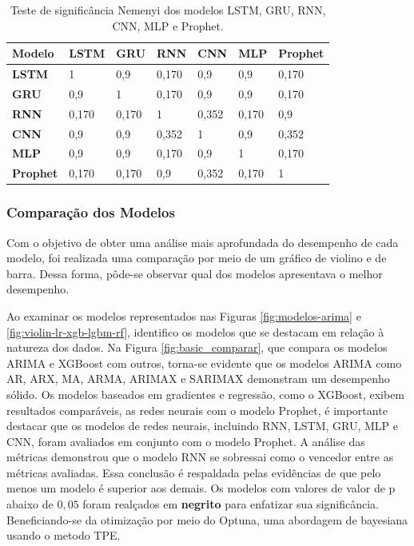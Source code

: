 \begin{table}[!htb]
	\caption{Teste de significância Nemenyi dos modelos LSTM, GRU, RNN, CNN, MLP e Prophet.}\label{tb:nemeyirede}
	\centering
\begin{tabular}{@{}lllllll@{}}
	\toprule
	\textbf{Modelo} & \textbf{LSTM} & \textbf{GRU} & \textbf{RNN} & \textbf{CNN} & \textbf{MLP} & \textbf{Prophet} \\ \midrule
	\textbf{LSTM}    & 1             & 0,9          & 0,170        & 0,9          & 0,9          & 0,170            \\
	\textbf{GRU}     & 0,9           & 1            & 0,170        & 0,9          & 0,9          & 0,170            \\
	\textbf{RNN}     & 0,170         & 0,170        & 1            & 0,352        & 0,170        & 0,9              \\
	\textbf{CNN}     & 0,9           & 0,9          & 0,352        & 1            & 0,9          & 0,352            \\
	\textbf{MLP}     & 0,9           & 0,9          & 0,170        & 0,9          & 1            & 0,170            \\
	\textbf{Prophet} & 0,170         & 0,170        & 0,9          & 0,352        & 0,170        & 1                \\ \bottomrule
\end{tabular}
\end{table}





\subsubsection{Compara\c c\~ao dos Modelos}

Com o objetivo de obter uma análise mais aprofundada do desempenho de cada modelo, foi realizada uma comparação por meio de um gráfico de violino e de barra. Dessa forma, pôde-se observar qual dos modelos apresentava o melhor desempenho.

Ao examinar os modelos representados nas Figuras \ref{fig:modelos-arima} e \ref{fig:violin-lr-xgb-lgbm-rf}, identifico os modelos que se destacam em relação à natureza dos dados. Na Figura \ref{fig:basic_comparar}, que compara os modelos ARIMA e XGBoost com outros, torna-se evidente que os modelos ARIMA como AR, ARX, MA, ARMA, ARIMAX e SARIMAX demonstram um desempenho sólido. Os modelos baseados em gradientes e regressão, como o XGBoost, exibem resultados comparáveis, as redes neurais com o modelo Prophet, é importante destacar que os modelos de redes neurais, incluindo RNN, LSTM, GRU, MLP e CNN, foram avaliados em conjunto com o modelo Prophet. A análise das métricas demonstrou que o modelo RNN se sobressai como o vencedor entre as métricas avaliadas. Essa conclusão é respaldada pelas evidências de que pelo menos um modelo é superior aos demais. Os modelos com valores de valor de p abaixo de $0,05$ foram realçados em \textbf{negrito} para enfatizar sua significância. Beneficiando-se da otimização por meio do Optuna, uma abordagem de bayesiana usando o metodo TPE.


